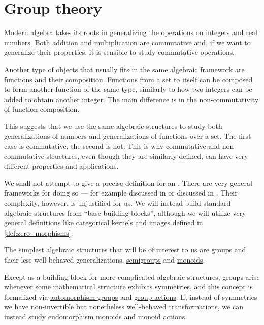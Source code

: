 \chapter{Group theory}\label{ch:group_theory}

Modern algebra takes its roots in generalizing the operations on \hyperref[def:integers]{integers} and \hyperref[def:real_numbers]{real numbers}. Both addition and multiplication are \hyperref[def:binary_operation/commutative]{commutative} and, if we want to generalize their properties, it is sensible to study commutative operations.

Another type of objects that usually fits in the same algebraic framework are \hyperref[def:function]{functions} and their \hyperref[def:set_valued_map/composition]{composition}. Functions from a set to itself can be composed to form another function of the same type, similarly to how two integers can be added to obtain another integer. The main difference is in the non-commutativity of function composition.

This suggests that we use the same algebraic structures to study both generalizations of numbers and generalizations of functions over a set. The first case is commutative, the second is not. This is why commutative and non-commutative structures, even though they are similarly defined, can have very different properties and applications.

We shall not attempt to give a precise definition for an . There are very general frameworks for doing so --- for example  discussed in \cite[ch. VI]{MacLane1998CategoryTheory} or  discussed in \cite[sec. 1.2.]{ЦаленкоШульгейфер1974ОсновыТеорииКатегорий}. Their complexity, however, is unjustified for us. We will instead build standard algebraic structures from \enquote{base building blocks}, although we will utilize very general definitions like categorical kernels and images defined in \cref{def:zero_morphisms}.

The simplest algebraic structures that will be of interest to us are \hyperref[def:group]{groups} and their less well-behaved generalizations, \hyperref[def:semigroup]{semigroups} and \hyperref[def:monoid]{monoids}.

Except as a building block for more complicated algebraic structures, groups arise whenever some mathematical structure exhibits symmetries, and this concept is formalized via \hyperref[def:automorphism_group]{automorphism groups} and \hyperref[def:group_action]{group actions}. If, instead of symmetries we have non-invertible but nonetheless well-behaved transformations, we can instead study \hyperref[def:endomorphism_monoid]{endomorphism monoids} and \hyperref[def:monoid_action]{monoid actions}.
